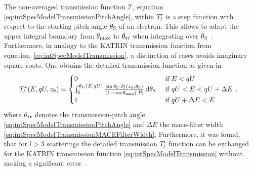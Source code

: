 The non-averaged transmission function $\mathcal{T}$, equation \eqref{eq:intSpecModelTransmissionPitchAngle},  within $T_l^{\star}$ is a step function with respect to the starting pitch angle $\theta_\mathrm{S}$ of an electron. This allows to adapt the upper integral boundary from $\theta_\mathrm{max}$ to $\theta_\mathrm{tr}$ when integrating over $\theta_\mathrm{S}$ . Furthermore, in analogy to the KATRIN transmission function from equation~\ref{eq:intSpecModelTransmission}, a distinction of cases avoids imaginary square roots. One obtains the detailed transmission function as given in~\cite{Groh2015,Kleesiek2019}
\begin{equation}
	\label{eq:intSpecModelDetailedTransmission}
	T_l^{\star}(E,qU,z_\mathrm{S}) =
	\begin{cases}
		0 &\text{ if } E < qU \\
		\int_{0}^{\theta_\mathrm{tr}(E,qU)}
		\frac{
			\sin\theta_\mathrm{S} \cdot
			P_l(z_\mathrm{S}, \theta_\mathrm{S})
		}{(1-\cos\theta_\mathrm{max}) \cdot \bar{P}_l}
		\mathop{}\!\mathrm{d} \theta_\mathrm{S}
		&\text{ if } qU < E < qU + \Delta E \\
		1 &\text{ if } qU+\Delta E < E
	\end{cases}
	\text{\,,}
\end{equation}
where $\theta_\mathrm{tr}$ denotes the transmission-pitch angle \eqref{eq:intSpecModelTransmissionPitchAngle} and $\Delta E$ the \gls{mace}-filter width \eqref{eq:intSpecModelTransmissionMACEFilterWidth}. Furthermore, it was found, that for $l>3$ scatterings the detailed transmission $T_l^{\star}$ function can be exchanged for the KATRIN transmission function \eqref{eq:intSpecModelTransmission} without making a significant error~\cite{Groh2015}.

